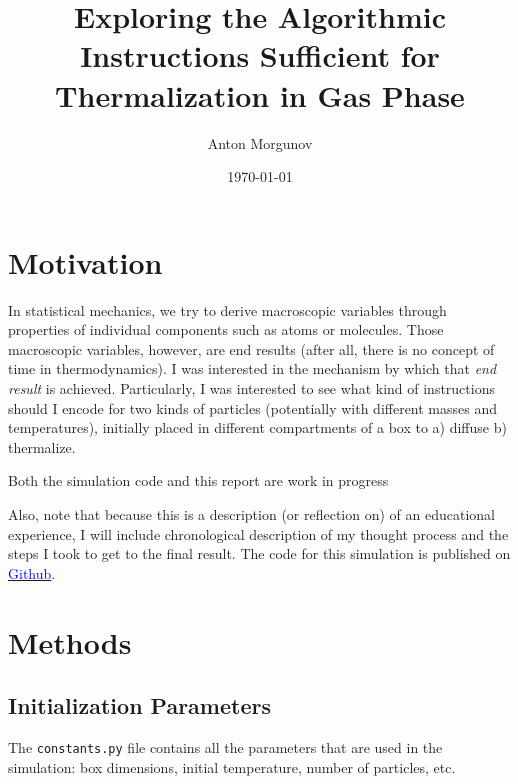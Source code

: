 \documentclass[12pt]{article}
\begin{document}
\title{Exploring the Algorithmic Instructions Sufficient for Thermalization in Gas Phase}
\author{Anton Morgunov}
\date{\today}

\maketitle



\section{Motivation}
In statistical mechanics, we try to derive macroscopic variables through properties of individual components such as atoms or molecules. Those macroscopic variables, however, are end results (after all, there is no concept of time in thermodynamics). I was interested in the mechanism by which that \textit{end result} is achieved. Particularly, I was interested to see what kind of instructions should I encode for two kinds of particles (potentially with different masses and temperatures), initially placed in different compartments of a box to a) diffuse b) thermalize. 

\begin{warningbox}
    Both the simulation code and this report are work in progress
\end{warningbox}

Also, note that because this is a description (or reflection on) of an educational experience, I will include chronological description of my thought process and the steps I took to get to the final result. The code for this simulation is published on \href{https://github.com/anmorgunov/statmech-simulation}{\textcolor{blue}{Github}}. 

\section{Methods}
\subsection{Initialization Parameters}
The \texttt{constants.py} file contains all the parameters that are used in the simulation: box dimensions, initial temperature, number of particles, etc.
\end{document}
